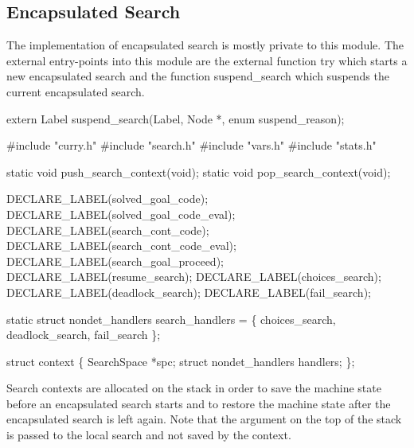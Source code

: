 %
%
\subsection{Encapsulated Search}
The implementation of encapsulated search is mostly private to this
module. The external entry-points into this module are the external
function {\Tt{}try\nwendquote} which starts a new encapsulated search and the
function {\Tt{}suspend{\_}search\nwendquote} which suspends the current encapsulated
search.

\nwenddocs{}\endmoddef\nwstartdeflinemarkup\nwenddeflinemarkup
extern Label suspend_search(Label, Node *, enum suspend_reason);

\nwendcode{}\nwdocspar
\nwenddocs{}\endmoddef\nwstartdeflinemarkup{}\nwenddeflinemarkup
#include "curry.h"
#include "search.h"
#include "vars.h"
#include "stats.h"

static void push_search_context(void);
static void pop_search_context(void);

DECLARE_LABEL(solved_goal_code);
DECLARE_LABEL(solved_goal_code_eval);
DECLARE_LABEL(search_cont_code);
DECLARE_LABEL(search_cont_code_eval);
DECLARE_LABEL(search_goal_proceed);
DECLARE_LABEL(resume_search);
DECLARE_LABEL(choices_search);
DECLARE_LABEL(deadlock_search);
DECLARE_LABEL(fail_search);

static struct nondet_handlers search_handlers = \{
    choices_search, deadlock_search, fail_search
\};

struct context \{
    SearchSpace            *spc;
    struct nondet_handlers handlers;
\};

\nwendcode{}\nwdocspar
Search contexts are allocated on the stack in order to save the
machine state before an encapsulated search starts and to restore the
machine state after the encapsulated search is left again. Note that
the argument on the top of the stack is passed to the local search and
not saved by the context.

